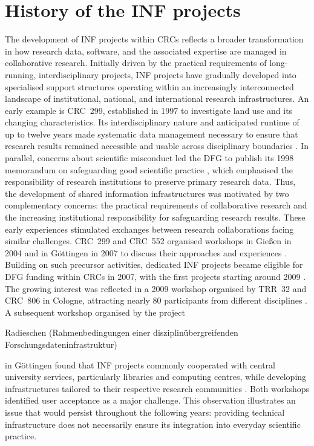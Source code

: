 \documentclass{eceasst}
\newenvironment{de}{\begin{otherlanguage}{ngerman}}{\end{otherlanguage}}
\begin{document}
\section{History of the INF projects}
\label{sec:history}
The development of INF projects
within CRCs reflects a
broader transformation in how research data, software, and
the associated expertise are managed in collaborative
research. Initially driven by the practical requirements
of long-running, interdisciplinary projects, INF projects
have gradually developed into specialised support structures
operating within an increasingly interconnected landscape
of institutional, national, and international research
infrastructures.
An early example is CRC~299, established in 1997 to
investigate land use and its changing characteristics.
Its interdisciplinary nature and anticipated runtime of
up to twelve years made systematic data management
necessary to ensure that research results remained
accessible and usable across disciplinary boundaries
\cite{mueckschel2006}.
In parallel, concerns about scientific misconduct led
the DFG to publish its
1998 memorandum on safeguarding good scientific practice
\cite{DFG1998}, which emphasised the responsibility of
research institutions to preserve primary research data.
Thus, the development of shared information infrastructures
was motivated by two complementary concerns: the practical
requirements of collaborative research and the increasing
institutional responsibility for safeguarding research
results.
These early experiences stimulated exchanges between
research collaborations facing similar challenges.
CRC~299 and CRC~552 organised workshops in Gießen in
2004 and in Göttingen in 2007 to discuss their approaches and experiences
\cite{SFB299-2004,SFB299-2005,SFB299-2007}.
Building on such precursor activities, dedicated INF
projects became eligible for DFG funding within CRCs
in 2007, with the first projects starting around 2009
\cite{Forschungsdateninfrastruktur2013}.
The growing interest was reflected in a 2009 workshop
organised by TRR~32 and CRC~806 in Cologne, attracting
nearly 80 participants from different disciplines
\cite{curdt787}.
A subsequent workshop organised by the project
\begin{de}Radieschen (Rahmenbedingungen einer
disziplinübergreifenden Forschungsdateninfrastruktur)
\end{de}
in Göttingen found that INF projects commonly cooperated
with central university services, particularly libraries
and computing centres, while developing infrastructures
tailored to their respective research communities
\cite{Forschungsdateninfrastruktur2013}.
Both workshops identified user acceptance as a major
challenge. This observation illustrates an issue that
would persist throughout the following years:
providing technical infrastructure does not necessarily
ensure its integration into everyday scientific practice.
\end{document}
